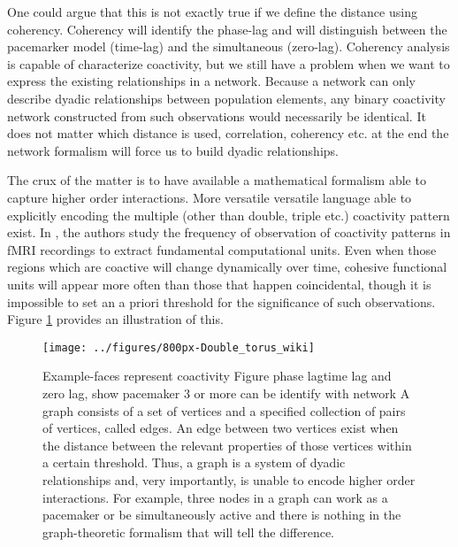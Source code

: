 \documentclass[onecollarge,runningheads]{svjour2}
\begin{document}
One could argue that this is not exactly true if we define the distance using coherency.
Coherency will identify the phase-lag and will distinguish between the pacemarker model (time-lag) and the simultaneous (zero-lag). %
Coherency analysis is capable of characterize coactivity, but we still have a problem when we want to express the existing relationships in a network. Because a network can only describe dyadic relationships between population elements, any binary coactivity network constructed from such observations would necessarily be identical. It does not matter which distance is used, correlation, coherency etc. at the end the network formalism will force us to build dyadic relationships.

The crux of the matter is to have available a mathematical formalism able to capture higher order interactions. More versatile versatile language able to explicitly encoding the multiple (other than double, triple etc.) coactivity pattern exist. In \cite{ellis2014describing}, the authors study the frequency of observation of coactivity patterns in fMRI recordings to extract fundamental computational units. Even when those regions which are coactive will change dynamically over time, cohesive functional units will appear more often than those that happen coincidental, though it is impossible to set an a priori threshold for the significance of such observations. Figure \ref{ex:dyadic} provides an illustration of this.


\begin{figure}[h]
        \centering
        \texttt{[image: ../figures/800px-Double\_torus\_wiki]}
        \caption{Example-faces represent coactivity
        Figure phase lagtime lag and zero lag, show pacemaker 3 or more can be identify with network
        A graph consists of a set of vertices and a specified collection of pairs of vertices, called edges. An edge between two vertices exist when the distance between the relevant properties of those vertices within a certain threshold. Thus, a graph is a system of dyadic relationships and, very importantly, is unable to encode higher order interactions. For example, three nodes in a graph can work as a pacemaker or be simultaneously active and there is nothing in the graph-theoretic formalism that will tell the difference.}
\label{ex:dyadic}
\end{figure}
\end{document}

